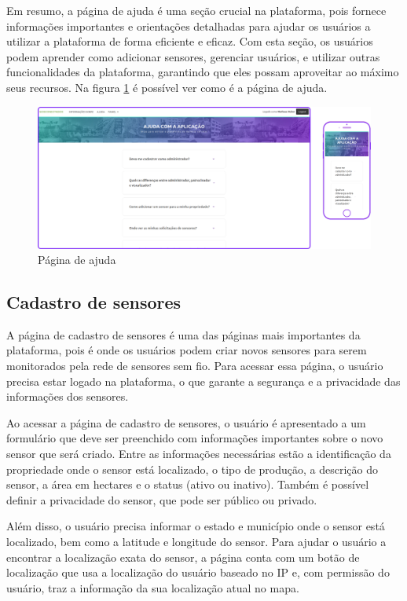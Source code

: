 \documentclass[tcc,capa]{texufpel}
\begin{document}
Em resumo, a página de ajuda é uma seção crucial na plataforma, pois fornece informações importantes e orientações detalhadas para ajudar os usuários a utilizar a plataforma de forma eficiente e eficaz. Com esta seção, os usuários podem aprender como adicionar sensores, gerenciar usuários, e utilizar outras funcionalidades da plataforma, garantindo que eles possam aproveitar ao máximo seus recursos. Na figura \ref{ajuda} é possível ver como é a página de ajuda.
\begin{figure}[htbp]
  \centering \includegraphics[scale=.2]{assets/ajuda.png}
  \caption{Página de ajuda}
  \label{ajuda}
\end{figure}
\newpage

\subsection{Cadastro de sensores}
A página de cadastro de sensores é uma das páginas mais importantes da plataforma, pois é onde os usuários podem criar novos sensores para serem monitorados pela rede de sensores sem fio. Para acessar essa página, o usuário precisa estar logado na plataforma, o que garante a segurança e a privacidade das informações dos sensores.

Ao acessar a página de cadastro de sensores, o usuário é apresentado a um formulário que deve ser preenchido com informações importantes sobre o novo sensor que será criado. Entre as informações necessárias estão a identificação da propriedade onde o sensor está localizado, o tipo de produção, a descrição do sensor, a área em hectares e o status (ativo ou inativo). Também é possível definir a privacidade do sensor, que pode ser público ou privado.

Além disso, o usuário precisa informar o estado e município onde o sensor está localizado, bem como a latitude e longitude do sensor. Para ajudar o usuário a encontrar a localização exata do sensor, a página conta com um botão de localização que usa a localização do usuário baseado no IP e, com permissão do usuário, traz a informação da sua localização atual no mapa.
\end{document}
